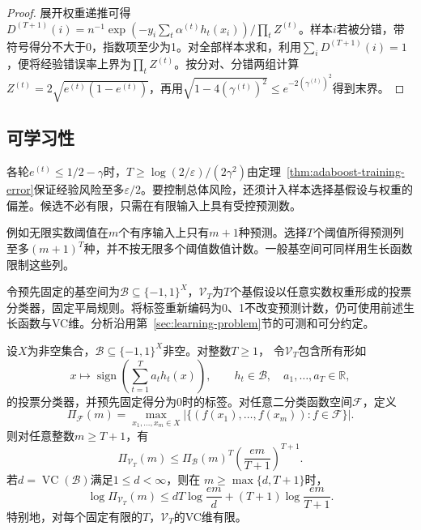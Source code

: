 \begin{proof}
展开权重递推可得$D^{(T+1)}(i)=n^{-1}\exp(-y_i\sum_t\alpha^{(t)}h_t(x_i))/\prod_tZ^{(t)}$。样本$i$若被分错，带符号得分不大于0，指数项至少为1。对全部样本求和，利用$\sum_iD^{(T+1)}(i)=1$，便将经验错误率上界为$\prod_tZ^{(t)}$。按分对、分错两组计算$Z^{(t)}=2\sqrt{e^{(t)}(1-e^{(t)})}$，再用$\sqrt{1-4(\gamma^{(t)})^2}\leq e^{-2(\gamma^{(t)})^2}$得到末界。
\end{proof}

\subsection{可学习性}

各轮$e^{(t)}\leq1/2-\gamma$时，$T\geq\log(2/\varepsilon)/(2\gamma^2)$由定理~\ref{thm:adaboost-training-error}保证经验风险至多$\varepsilon/2$。要控制总体风险，还须计入样本选择基假设与权重的偏差。候选不必有限，只需在有限输入上具有受控预测数。

例如无限实数阈值在$m$个有序输入上只有$m+1$种预测。选择$T$个阈值所得预测列至多$(m+1)^T$种，并不按无限多个阈值数值计数。一般基空间可同样用生长函数限制这些列。

令预先固定的基空间为$\mathcal B\subseteq\{-1,1\}^X$，$\mathcal V_T$为$T$个基假设以任意实数权重形成的投票分类器，固定平局规则。将标签重新编码为0、1不改变预测计数，仍可使用前述生长函数与VC维。分析沿用第~\ref{sec:learning-problem}节的可测和可分约定。

\begin{theorem}[投票假设空间的生长函数]
\label{thm:vote-growth-infinite}
设$X$为非空集合，$\mathcal B\subseteq\{-1,1\}^X$非空。对整数$T\geq1$，
令$\mathcal V_T$包含所有形如
\[
 x\mapsto\operatorname{sign}\!\left(\sum_{t=1}^T a_t h_t(x)\right),
 \qquad h_t\in\mathcal B,\quad a_1,\ldots,a_T\in\mathbb R,
\]
的投票分类器，并预先固定得分为0时的标签。对任意二分类函数空间$\mathcal F$，定义
\[
 \Pi_{\mathcal F}(m)
 =\max_{x_1,\ldots,x_m\in X}
 \left|\{(f(x_1),\ldots,f(x_m)):f\in\mathcal F\}\right|.
\]
则对任意整数$m\geq T+1$，有
\begin{equation}
 \Pi_{\mathcal V_T}(m)
 \leq\Pi_{\mathcal B}(m)^T
       \left(\frac{em}{T+1}\right)^{T+1}.
 \label{eq:boosting-vote-growth}
\end{equation}
若$d=\operatorname{VC}(\mathcal B)$满足$1\leq d<\infty$，则在
$m\geq\max\{d,T+1\}$时，
\begin{equation}
 \log\Pi_{\mathcal V_T}(m)
 \leq dT\log\frac{em}{d}+(T+1)\log\frac{em}{T+1}.
 \label{eq:infinite-boosting-growth}
\end{equation}
特别地，对每个固定有限的$T$，$\mathcal V_T$的VC维有限。
\end{theorem}

